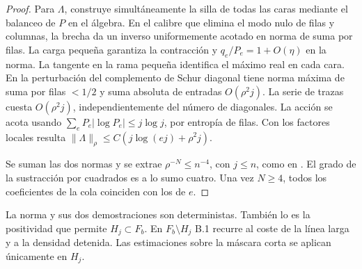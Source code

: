 \begin{proof}
Para \(\Lambda\),  construye simultáneamente la silla de todas las caras
mediante el balanceo de \(P\) en el álgebra. En el calibre que elimina el modo nulo de
filas y columnas, la brecha da un inverso uniformemente acotado en norma de suma
por filas. La carga pequeña garantiza la contracción y \(q_e/P_e=1+O(\eta)\) en la
norma. La tangente en la rama pequeña identifica el máximo real en cada cara.
En  la perturbación del complemento de Schur diagonal tiene norma
máxima de suma por filas \(<1/2\) y suma absoluta de entradas \(O(\rho^2j)\).
La serie de trazas cuesta \(O(\rho^2j)\), independientemente del número de diagonales.
La acción se acota usando \(\sum_e P_e|\log P_e|\le j\log j\), por entropía de filas.
Con los factores locales resulta \(\|\Lambda\|_\rho\le C(j\log(ej)+\rho^2j)\).

Se suman las dos normas y se extrae \(\rho^{-N}\le n^{-4}\), con \(j\le n\),
como en . El grado de la sustracción por cuadrados es a lo sumo cuatro.
Una vez \(N\ge4\), todos los coeficientes de la cola coinciden con los de \(e\).
\end{proof}
La norma y sus dos demostraciones son deterministas. También lo es la positividad
que permite \(H_j\subset F_b\). En \(F_b\setminus H_j\) B.1 recurre al coste de
la línea larga y a la densidad detenida. Las estimaciones sobre la máscara corta
se aplican únicamente en \(H_j\).
